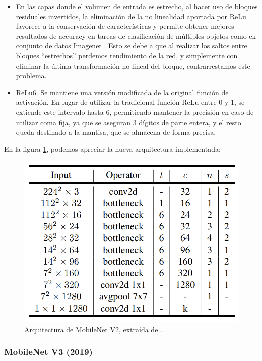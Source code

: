 \begin{itemize}
     \item En las capas donde el volumen de entrada es estrecho, al hacer uso de bloques residuales invertidos, la eliminación de la no linealidad aportada por ReLu favorece a la conservación de características y permite obtener mejores resultados de accuracy en tareas de clasificación de múltiples objetos como ek conjunto de datos Imagenet \cite{NIPS2012_c399862d}. Esto se debe a que al realizar los saltos entre bloques ``estrechos'' perdemos rendimiento de la red, y simplemente con eliminar la última transformación no lineal del bloque, contrarrestamos este problema.
    \item ReLu6. Se mantiene una versión modificada de la original función de activación. En lugar de utilizar la tradicional función ReLu entre 0 y 1, se extiende este intervalo hasta 6, permitiendo mantener la precisión en caso de utilizar coma fija, ya que se aseguran 3 dígitos de parte entera, y el resto queda destinado a la mantisa, que se almacena de forma precisa.
\end{itemize}

En la figura \ref{fig:mobilenet2}, podemos apreciar la nueva arquitectura implementada:

    \begin{figure}[H]
	\centering
	\includegraphics[scale = 0.3]{imagenes/MobileNetV2.png}
	\caption{Arquitectura de MobileNet V2, extraída de \cite{sandler2019mobilenetv2}.}
	\label{fig:mobilenet2}
\end{figure}

\subsubsection{MobileNet V3 (2019)}

